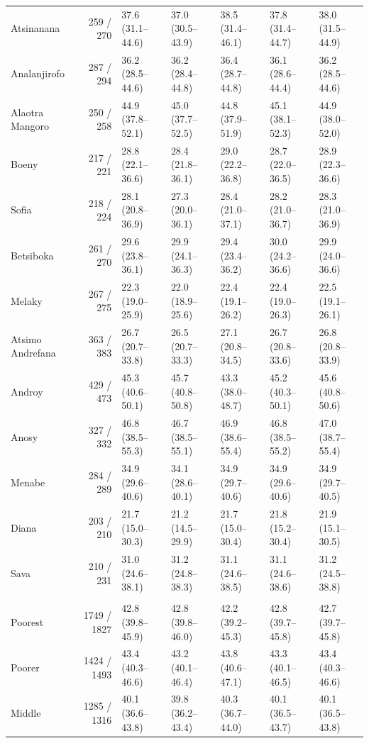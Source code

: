 \begin{longtable}{l|rlllll}
Atsinanana & 259 / 270 & 37.6 (31.1–44.6) & 37.0 (30.5–43.9) & 38.5 (31.4–46.1) & 37.8 (31.4–44.7) & 38.0 (31.5–44.9) \\ 
Analanjirofo & 287 / 294 & 36.2 (28.5–44.6) & 36.2 (28.4–44.8) & 36.4 (28.7–44.8) & 36.1 (28.6–44.4) & 36.2 (28.5–44.6) \\ 
Alaotra Mangoro & 250 / 258 & 44.9 (37.8–52.1) & 45.0 (37.7–52.5) & 44.8 (37.9–51.9) & 45.1 (38.1–52.3) & 44.9 (38.0–52.0) \\ 
Boeny & 217 / 221 & 28.8 (22.1–36.6) & 28.4 (21.8–36.1) & 29.0 (22.2–36.8) & 28.7 (22.0–36.5) & 28.9 (22.3–36.6) \\ 
Sofia & 218 / 224 & 28.1 (20.8–36.9) & 27.3 (20.0–36.1) & 28.4 (21.0–37.1) & 28.2 (21.0–36.7) & 28.3 (21.0–36.9) \\ 
Betsiboka & 261 / 270 & 29.6 (23.8–36.1) & 29.9 (24.1–36.3) & 29.4 (23.4–36.2) & 30.0 (24.2–36.6) & 29.9 (24.0–36.6) \\ 
Melaky & 267 / 275 & 22.3 (19.0–25.9) & 22.0 (18.9–25.6) & 22.4 (19.1–26.2) & 22.4 (19.0–26.3) & 22.5 (19.1–26.1) \\ 
Atsimo Andrefana & 363 / 383 & 26.7 (20.7–33.8) & 26.5 (20.7–33.3) & 27.1 (20.8–34.5) & 26.7 (20.8–33.6) & 26.8 (20.8–33.9) \\ 
Androy & 429 / 473 & 45.3 (40.6–50.1) & 45.7 (40.8–50.8) & 43.3 (38.0–48.7) & 45.2 (40.3–50.1) & 45.6 (40.8–50.6) \\ 
Anosy & 327 / 332 & 46.8 (38.5–55.3) & 46.7 (38.5–55.1) & 46.9 (38.6–55.4) & 46.8 (38.5–55.2) & 47.0 (38.7–55.4) \\ 
Menabe & 284 / 289 & 34.9 (29.6–40.6) & 34.1 (28.6–40.1) & 34.9 (29.7–40.6) & 34.9 (29.6–40.6) & 34.9 (29.7–40.5) \\ 
Diana & 203 / 210 & 21.7 (15.0–30.3) & 21.2 (14.5–29.9) & 21.7 (15.0–30.4) & 21.8 (15.2–30.4) & 21.9 (15.1–30.5) \\ 
Sava & 210 / 231 & 31.0 (24.6–38.1) & 31.2 (24.8–38.3) & 31.1 (24.6–38.5) & 31.1 (24.6–38.6) & 31.2 (24.5–38.8) \\ 
\midrule\addlinespace[2.5pt]
\multicolumn{7}{l}{Stunting — Wealth quintile} \\[2.5pt] 
\midrule\addlinespace[2.5pt]
Poorest & 1749 / 1827 & 42.8 (39.8–45.9) & 42.8 (39.8–46.0) & 42.2 (39.2–45.3) & 42.8 (39.7–45.8) & 42.7 (39.7–45.8) \\ 
Poorer & 1424 / 1493 & 43.4 (40.3–46.6) & 43.2 (40.1–46.4) & 43.8 (40.6–47.1) & 43.3 (40.1–46.5) & 43.4 (40.3–46.6) \\ 
Middle & 1285 / 1316 & 40.1 (36.6–43.8) & 39.8 (36.2–43.4) & 40.3 (36.7–44.0) & 40.1 (36.5–43.7) & 40.1 (36.5–43.8) \\ 

\end{longtable}

